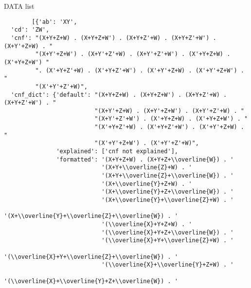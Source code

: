     
        DATA list
        \begin{verbatim}
        [{'ab': 'XY',
  'cd': 'ZW',
  'cnf': "(X+Y+Z+W) . (X+Y+Z+W') . (X+Y+Z'+W) . (X+Y+Z'+W') . (X+Y'+Z+W) . "
         "(X+Y'+Z+W') . (X+Y'+Z'+W) . (X+Y'+Z'+W') . (X'+Y+Z+W) . (X'+Y+Z+W') "
         ". (X'+Y+Z'+W) . (X'+Y+Z'+W') . (X'+Y'+Z+W) . (X'+Y'+Z+W') . "
         "(X'+Y'+Z'+W)",
  'cnf_dict': {'default': "(X+Y+Z+W) . (X+Y+Z+W') . (X+Y+Z'+W) . (X+Y+Z'+W') . "
                          "(X+Y'+Z+W) . (X+Y'+Z+W') . (X+Y'+Z'+W) . "
                          "(X+Y'+Z'+W') . (X'+Y+Z+W) . (X'+Y+Z+W') . "
                          "(X'+Y+Z'+W) . (X'+Y+Z'+W') . (X'+Y'+Z+W) . "
                          "(X'+Y'+Z+W') . (X'+Y'+Z'+W)",
               'explained': ['cnf not explained'],
               'formatted': '(X+Y+Z+W) . (X+Y+Z+\\overline{W}) . '
                            '(X+Y+\\overline{Z}+W) . '
                            '(X+Y+\\overline{Z}+\\overline{W}) . '
                            '(X+\\overline{Y}+Z+W) . '
                            '(X+\\overline{Y}+Z+\\overline{W}) . '
                            '(X+\\overline{Y}+\\overline{Z}+W) . '
                            '(X+\\overline{Y}+\\overline{Z}+\\overline{W}) . '
                            '(\\overline{X}+Y+Z+W) . '
                            '(\\overline{X}+Y+Z+\\overline{W}) . '
                            '(\\overline{X}+Y+\\overline{Z}+W) . '
                            '(\\overline{X}+Y+\\overline{Z}+\\overline{W}) . '
                            '(\\overline{X}+\\overline{Y}+Z+W) . '
                            '(\\overline{X}+\\overline{Y}+Z+\\overline{W}) . '

\end{verbatim}
